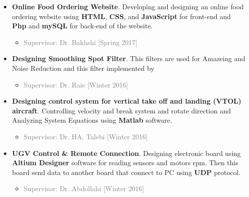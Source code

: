 \documentclass[10pt,a4paper,sans]{moderncv} %
\begin{document}
\begin{itemize}
	\item \textbf{Online Food Ordering Website}. Developing and designing an online food ordering website using \textbf{HTML}, \textbf{CSS}, and \textbf{JavaScript} for front-end and \textbf{Php} and \textbf{mySQL} for back-end of the website.
	\begin{itemize}
		\item \textcolor{gray}{Supervisor: Dr. Bakhshi [Spring 2017]}
		\newline
	\end{itemize}

	\item \textbf{Designing Smoothing Spot Filter}. This filters are used for Amazeing and Noise Reduction and this filter implemented by %
	\begin{itemize}
		\item \textcolor{gray}{Supervisor: Dr. Raie [Winter 2016]}
		\newline
	\end{itemize}

	\item \textbf{Designing control system for vertical take off and landing (VTOL) aircraft}. Controlling velocity and break system and rotate direction and Analyzing System Equations using \textbf{Matlab} software.
	\begin{itemize}
		\item \textcolor{gray}{Supervisor: Dr. HA. Talebi [Winter 2016]}
		\newline
	\end{itemize}

	\item \textbf{UGV Control \& Remote Connection}. Designing electronic board using \textbf{Altium Designer} software for reading sensors and motors rpm. Then this board send data to another board that connect to PC using \textbf{UDP} protocol.
	\begin{itemize}
		\item \textcolor{gray}{Supervisor: Dr. Abdollahi [Winter 2016]}
		\newline
	\end{itemize}


\end{itemize}






\end{document}
